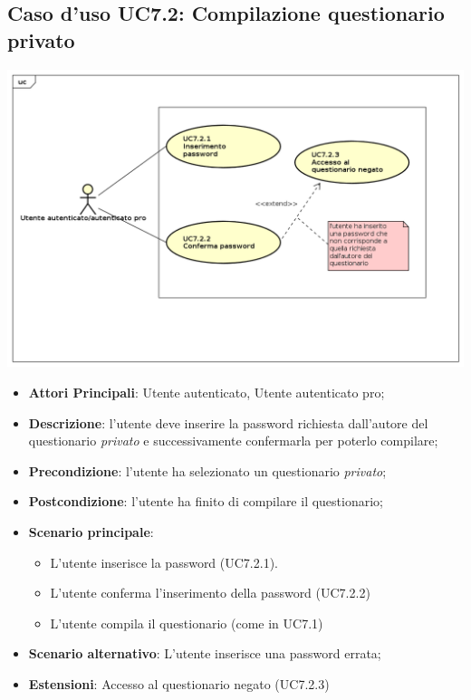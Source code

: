 \subsection{Caso d'uso UC7.2: Compilazione questionario privato}
\begin{center}
\includegraphics[scale=0.5]{UML/UC7.2.png}
\end{center}
\begin{itemize}
\item\textbf{Attori Principali}: Utente autenticato, Utente autenticato pro;
\item\textbf{Descrizione}: l'utente deve inserire la password richiesta dall'autore del questionario \textit{privato} e successivamente confermarla per poterlo compilare;
\item\textbf{Precondizione}: l'utente ha selezionato un questionario \textit{privato};
\item\textbf{Postcondizione}: l'utente ha finito di compilare il questionario;
\item\textbf{Scenario principale}:
\begin{itemize}
\item L'utente inserisce la password (UC7.2.1).
\item L'utente conferma l'inserimento della password (UC7.2.2)
\item L'utente compila il questionario (come in UC7.1)
\end{itemize}
\item\textbf{Scenario alternativo}: L'utente inserisce una password errata;
\item\textbf{Estensioni}: Accesso al questionario negato (UC7.2.3)
\end{itemize}

